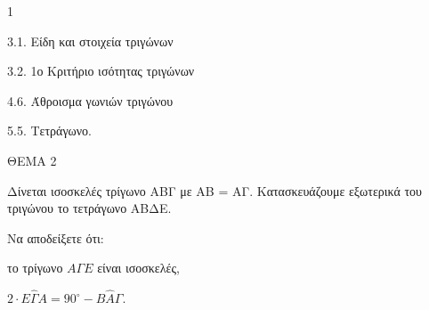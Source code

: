 \begin{ylh}{1}
    \item 3.1. Είδη και στοιχεία τριγώνων
    \item 3.2. 1ο Κριτήριο ισότητας τριγώνων
    \item 4.6. Άθροισμα γωνιών τριγώνου
    \item 5.5. Τετράγωνο.
\end{ylh}

ΘΕΜΑ 2

Δίνεται ισοσκελές τρίγωνο ΑΒΓ με ΑΒ = ΑΓ. Κατασκευάζουμε εξωτερικά του τριγώνου το τετράγωνο ΑΒΔΕ.

Να αποδείξετε ότι:

\begin{alist}
\item το τρίγωνο $A\Gamma E$ είναι ισοσκελές, 
\item $2 \cdot E\widehat{\Gamma}A = 90^{\circ} - B\widehat{A}\Gamma$. 

\begin{center}
\end{center}
\end{alist}
